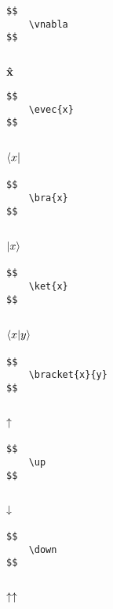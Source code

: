 \documentclass[a4paper]{article}
\begin{document}
\begin{verbatim}
$$
	\vnabla
$$
\end{verbatim}

\subsection{$ \mathbf{\hat{x}}$}

\begin{verbatim}
$$
	\evec{x}
$$
\end{verbatim}

\subsection{$ \langle x|$}

\begin{verbatim}
$$
	\bra{x}
$$
\end{verbatim}

\subsection{$ |x\rangle$}

\begin{verbatim}
$$
	\ket{x}
$$
\end{verbatim}

\subsection{$ \langle x| y\rangle$}

\begin{verbatim}
$$
	\bracket{x}{y}
$$
\end{verbatim}

\subsection{$ \uparrow$}

\begin{verbatim}
$$
	\up
$$
\end{verbatim}

\subsection{$ \downarrow$}

\begin{verbatim}
$$
	\down
$$
\end{verbatim}

\subsection{$ \uparrow \uparrow$}
\end{document}
